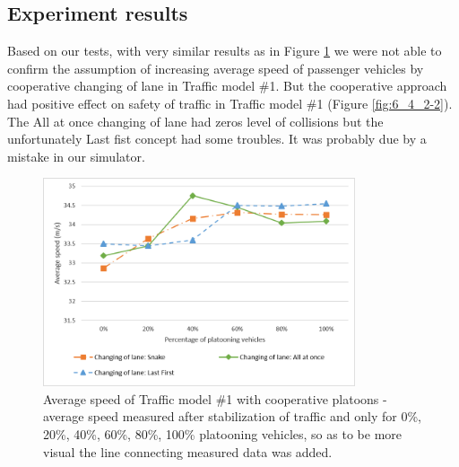 \subsection*{Experiment results}

Based on our tests, with very similar results as in Figure \ref{fig:6_4_2-1} we were not able to confirm the assumption of increasing average speed of passenger vehicles by cooperative changing of lane in Traffic model \#1. But the cooperative approach had positive effect on safety of traffic in Traffic model \#1 (Figure \ref{fig:6_4_2-2}). The All at once changing of lane had zeros level of collisions but the unfortunately Last fist concept had some troubles. It was probably  due by a mistake in our simulator.


\begin{figure}[ph]
\centering
\includegraphics[width=0.82\textwidth,height=0.82\textheight,keepaspectratio]{figures/Chapter_6/6_E3_avgSpeed.png}
\centering
\protect\caption[Average speed of Traffic model \#1 with cooperative platoons]{\label{fig:6_4_2-1}Average speed of Traffic model \#1  with cooperative platoons - average speed measured after stabilization of traffic and only for 0\%, 20\%, 40\%, 60\%, 80\%, 100\% platooning vehicles, so as to be more visual the line connecting measured data was added.}
\end{figure}

